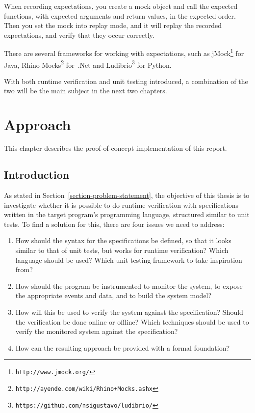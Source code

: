 \documentclass[a4paper,11pt]{kth-mag}
\begin{document}
When recording expectations, you create a mock object and call the expected
functions, with expected arguments and return values, in the expected order.
Then you set the mock into replay mode, and it will replay the recorded
expectations, and verify that they occur correctly.

There are several frameworks for working with expectations, such as
jMock\footnote{\texttt{http://www.jmock.org/}} for Java, Rhino
Mocks\footnote{\texttt{http://ayende.com/wiki/Rhino+Mocks.ashx}} for~.Net and
Ludibrio\footnote{\texttt{https://github.com/nsigustavo/ludibrio/}} for Python.

With both runtime verification and unit testing introduced, a combination of
the two will be the main subject in the next two chapters.






\pagestyle{newchap}
\chapter{Approach} \label{chapter-approach}

This chapter describes the proof-of-concept implementation of this report.


\section{Introduction}

As stated in Section~\ref{section-problem-statement}, the objective of this
thesis is to investigate whether it is possible to do runtime verification with
specifications written in the target program's programming language, structured
similar to unit tests. To find a solution for this, there are four issues we
need to address:

\begin{enumerate}
  \item How should the syntax for the specifications be defined, so that it
    looks similar to that of unit tests, but works for runtime verification?
    Which language should be used? Which unit testing framework to take
    inspiration from?
	\item How should the program be instrumented to monitor the system, to expose
		the appropriate events and data, and to build the system model?
  \item How will this be used to verify the system against the specification?
    Should the verification be done online or offline? Which techniques should
    be used to verify the monitored system against the specification?
	\item How can the resulting approach be provided with a formal foundation?
\end{enumerate}
\end{document}

